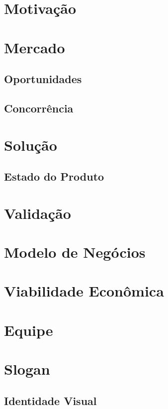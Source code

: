 \documentclass[a4paper]{article}
\begin{document}

    \tableofcontents
    \thispagestyle{empty}
    \pagebreak

    \section{Motivação}
    
    \section{Mercado}
    	\subsection{Oportunidades}
        
        \subsection{Concorrência}
    
    \section{Solução}
    	\subsection{Estado do Produto}
    
    \section{Validação}
    
    \section{Modelo de Negócios}
    
    \section{Viabilidade Econômica}
    
    \section{Equipe}
    
    \section{Slogan}
    	\subsection{Identidade Visual}
%
%
   
    
    
\end{document}
